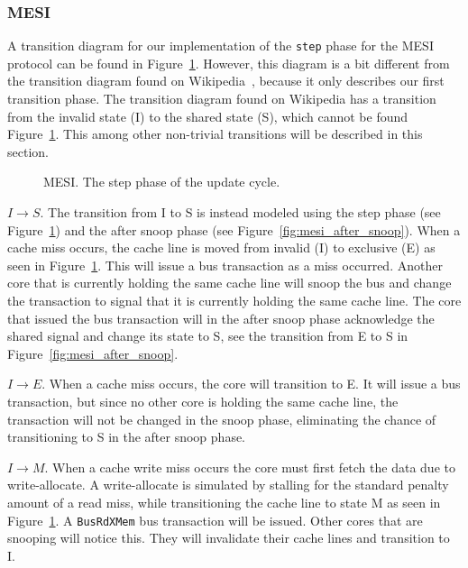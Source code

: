 \subsubsection{MESI}

A transition diagram for our implementation of the \texttt{step} phase for the MESI protocol can be found in Figure~\ref{fig:mesi}.
However, this diagram is a bit different from the transition diagram found on
Wikipedia~\cite{mesi_wiki}, because it only describes our first transition phase.
The transition diagram found on Wikipedia has a transition from the invalid state (I) to the shared
state (S), which cannot be found Figure~\ref{fig:mesi}.
This among other non-trivial transitions will be described in this section.


\begin{figure}[H]
    \centering
    \caption{MESI. The step phase of the update cycle.}\label{fig:mesi}
\end{figure}

$I \to S$.
The transition from I to S is instead modeled using the step phase (see Figure~\ref{fig:mesi}) and the after snoop phase (see Figure~\ref{fig:mesi_after_snoop}).
When a cache miss occurs, the cache line is moved from invalid (I) to exclusive (E) as seen in Figure~\ref{fig:mesi}.
This will issue a bus transaction as a miss occurred.
Another core that is currently holding the same cache line will snoop the bus and change the transaction to signal that it is currently holding the same cache line.
The core that issued the bus transaction will in the after snoop phase acknowledge the shared signal and change its state to S, see the transition from E to S in Figure~\ref{fig:mesi_after_snoop}.

$I \to E$.
When a cache miss occurs, the core will transition to E.
It will issue a bus transaction, but since no other core is holding the same cache line, the transaction will not be changed in the snoop phase, eliminating the chance of transitioning to S in the after snoop phase.

$I \to M$.
When a cache write miss occurs the core must first fetch the data due to write-allocate.
A write-allocate is simulated by stalling for the standard penalty amount of a read miss, while transitioning the cache line to state M as seen in Figure~\ref{fig:mesi}.
A \texttt{BusRdXMem} bus transaction will be issued.
Other cores that are snooping will notice this.
They will invalidate their cache lines and transition to I.

